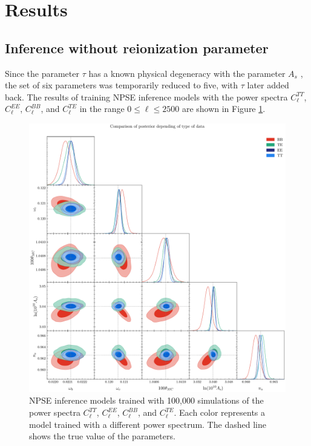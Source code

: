 \section{Results}
\subsection{Inference without reionization parameter}
Since the parameter $\tau$ has a known physical degeneracy with the parameter $A_s$ \cite{HuWhite1997}, the set of six parameters was temporarily reduced to five, with $\tau$ later added back. The results of training NPSE inference models with the power spectra $C_{\ell}^{TT}$, $C_{\ell}^{EE}$, $C_{\ell}^{BB}$, and $C_{\ell}^{TE}$ in the range $0 \leq \ell \leq 2500$ are shown in Figure \ref{fig:parameters_inference}.  

\begin{figure}
    \centering
    \includegraphics[scale=0.35]{img/data_comparison.pdf}
    \caption{NPSE inference models trained with 100,000 simulations of the power spectra $C_{\ell}^{TT}$, $C_{\ell}^{EE}$, $C_{\ell}^{BB}$, and $C_{\ell}^{TE}$. Each color represents a model trained with a different power spectrum. The dashed line shows the true value of the parameters.}
    \label{fig:parameters_inference}
\end{figure}

